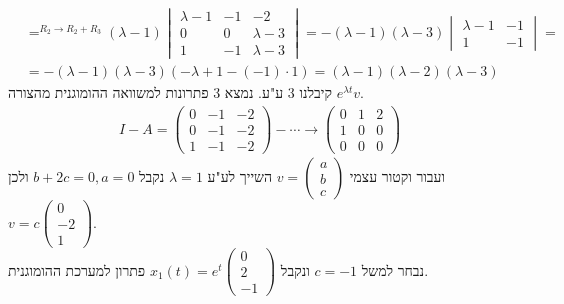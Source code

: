 \documentclass{article}
\DeclareMathOperator*{\equals}{=}
\begin{document}
\begin{align*}
                    & \equals^{R_2\rightarrow R_2+R_3} (\lambda-1)\begin{vmatrix}
                                                                      \lambda-1 & -1 & -2        \\
                                                                      0         & 0  & \lambda-3 \\
                                                                      1         & -1 & \lambda-3
                                                                  \end{vmatrix}=-(\lambda-1)(\lambda-3)\begin{vmatrix}
                                                                                                           \lambda-1 & -1 \\
                                                                                                           1         & -1
                                                                                                       \end{vmatrix} =  \\
                    & = -(\lambda-1)(\lambda-3)(-\lambda+1-(-1)\cdot 1)=(\lambda-1)(\lambda-2)(\lambda-3)
\end{align*}
קיבלנו 3 ע"ע. נמצא 3 פתרונות למשוואה ההומוגנית מהצורה $e^{\lambda t}v$.
\begin{align*}
    I-A=\begin{pmatrix}
            0 & -1 & -2 \\
            0 & -1 & -2 \\
            1 & -1 & -2
        \end{pmatrix}-\cdots\rightarrow\begin{pmatrix}
                                           0 & 1 & 2 \\
                                           1 & 0 & 0 \\
                                           0 & 0 & 0
                                       \end{pmatrix}
\end{align*}
ועבור וקטור עצמי $v=\begin{pmatrix}
        a \\
        b \\
        c
    \end{pmatrix}$ השייך לע"ע $\lambda=1$ נקבל $b+2c=0, a=0$ ולכן $v=c\begin{pmatrix}
        0  \\
        -2 \\
        1
    \end{pmatrix}$. \\ נבחר למשל $c=-1$ ונקבל $x_1(t)=e^t\begin{pmatrix}
        0 \\
        2 \\
        -1
    \end{pmatrix}$ פתרון למערכת ההומוגנית.
\end{document}
